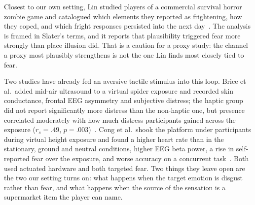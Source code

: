 Closest to our own setting, Lin studied players of a commercial survival horror
zombie game and catalogued which elements they reported as frightening, how they
coped, and which fright responses persisted into the next day~\cite{Lin.2017}.
The analysis is framed in Slater's terms, and it reports that plausibility
triggered fear more strongly than place illusion did. That is a caution for a
proxy study: the channel a proxy most plausibly strengthens is not the one Lin
finds most closely tied to fear.

Two studies have already fed an aversive tactile stimulus into this loop. Brice
et al.\ added mid-air ultrasound to a virtual spider exposure and recorded skin
conductance, frontal EEG asymmetry and subjective distress; the haptic group did
not report significantly more distress than the non-haptic one, but presence
correlated moderately with how much distress participants gained across the
exposure ($r_s = .49$, $p = .003$)~\cite{Brice.2021}. Cong et al.\ shook the
platform under participants during virtual height exposure and found a higher
heart rate than in the stationary, ground and neutral conditions, higher EEG
beta power, a rise in self-reported fear over the exposure, and worse accuracy
on a concurrent task~\cite{Cong.2025}. Both used actuated hardware and both
targeted fear. Two things they leave open are the two our setting turns on: what
happens when the target emotion is disgust rather than fear, and what happens
when the source of the sensation is a supermarket item the player can name.


